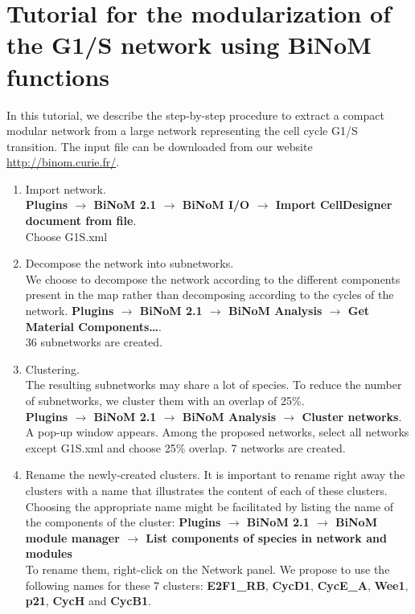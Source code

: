 \documentclass[a4paper,10pt]{article}
\begin{document}
\section*{Tutorial for the modularization of the G1/S network using BiNoM functions}
In this tutorial, we describe the step-by-step procedure to extract a compact
modular network from a large network representing the cell cycle G1/S
transition. The input file can be downloaded from our website
\url{http://binom.curie.fr/}.
\begin{enumerate}
\item Import network. \\
\textbf{Plugins $\rightarrow$ BiNoM 2.1 $\rightarrow$ BiNoM I/O $\rightarrow$ Import CellDesigner document
from file}.  \\
Choose G1S.xml


\item	Decompose the network into subnetworks. \\
We choose to decompose the network according to the different components present
in the map rather than decomposing according to the cycles of the network. 
\textbf{Plugins $\rightarrow$ BiNoM 2.1 $\rightarrow$ BiNoM Analysis $\rightarrow$ Get Material
Components…}.\\
36 subnetworks are created.

\item	Clustering. \\
The resulting subnetworks may share a lot of species. To reduce the number of
subnetworks, we cluster them with an overlap of 25\%. \\
\textbf{Plugins $\rightarrow$  BiNoM 2.1 $\rightarrow$ BiNoM Analysis $\rightarrow$ Cluster networks}. \\
A pop-up window appears. Among the proposed networks, select all networks except
G1S.xml and choose 25\% overlap. 7 networks are created.

\item	Rename the newly-created clusters.
It is important to rename right away the clusters with a name that illustrates
the content of each of these clusters. 
Choosing the appropriate name might be facilitated by listing the name of the
components of the cluster: \textbf{Plugins $\rightarrow$  BiNoM 2.1 $\rightarrow$ BiNoM module manager
$\rightarrow$ List components of species in network and modules} \\
To rename them, right-click on the Network panel.
We propose to use the following names for these 7 clusters: \textbf{E2F1\_RB},
\textbf{CycD1}, \textbf{CycE\_A}, \textbf{Wee1}, \textbf{p21}, \textbf{CycH} and
\textbf{CycB1}.



\end{enumerate}
\end{document}

